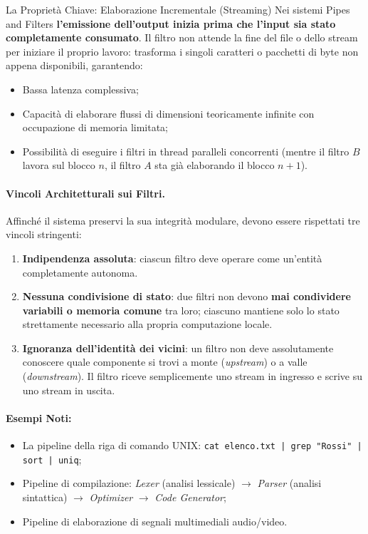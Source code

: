 \documentclass[12pt]{extarticle}
\begin{document}
\begin{cbox}{La Proprietà Chiave: Elaborazione Incrementale (Streaming)}
\noindent Nei sistemi Pipes and Filters \textbf{l'emissione dell'output inizia prima che l'input sia stato completamente consumato}.
Il filtro non attende la fine del file o dello stream per iniziare il proprio lavoro: trasforma i singoli caratteri o pacchetti di byte non appena disponibili, garantendo:
\begin{itemize}
    \item Bassa latenza complessiva;
    \item Capacità di elaborare flussi di dimensioni teoricamente infinite con occupazione di memoria limitata;
    \item Possibilità di eseguire i filtri in thread paralleli concorrenti (mentre il filtro $B$ lavora sul blocco $n$, il filtro $A$ sta già elaborando il blocco $n+1$).
\end{itemize}
\end{cbox}

\paragraph{Vincoli Architetturali sui Filtri.}
Affinché il sistema preservi la sua integrità modulare, devono essere rispettati tre vincoli stringenti:
\begin{enumerate}
    \item \textbf{Indipendenza assoluta}: ciascun filtro deve operare come un'entità completamente autonoma.
    \item \textbf{Nessuna condivisione di stato}: due filtri non devono \textbf{mai condividere variabili o memoria comune} tra loro; ciascuno mantiene solo lo stato strettamente necessario alla propria computazione locale.
    \item \textbf{Ignoranza dell'identità dei vicini}: un filtro non deve assolutamente conoscere quale componente si trovi a monte (\textit{upstream}) o a valle (\textit{downstream}). Il filtro riceve semplicemente uno stream in ingresso e scrive su uno stream in uscita.
\end{enumerate}

\paragraph{Esempi Noti:}
\begin{itemize}
    \item La pipeline della riga di comando UNIX: \texttt{cat elenco.txt | grep "Rossi" | sort | uniq};
    \item Pipeline di compilazione: \textit{Lexer} (analisi lessicale) $\to$ \textit{Parser} (analisi sintattica) $\to$ \textit{Optimizer} $\to$ \textit{Code Generator};
    \item Pipeline di elaborazione di segnali multimediali audio/video.
\end{itemize}
\end{document}
